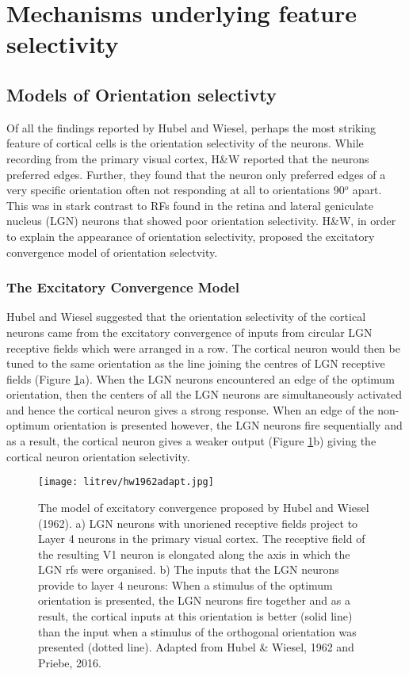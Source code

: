 \section{Mechanisms underlying feature selectivity}



\subsection{Models of Orientation selectivty}

Of all the findings reported by Hubel and Wiesel, perhaps the most striking feature of cortical cells is the orientation selectivity of the neurons. While recording from the primary visual cortex, H\&W reported that the neurons preferred edges. Further, they found that the neuron only preferred edges of a very specific orientation often not responding at all to orientations 90$^o$ apart. This was in stark contrast to RFs found in the retina and lateral geniculate nucleus (LGN) neurons that showed poor orientation selectivity. H\&W, in order to explain the appearance of orientation selectivity, proposed the excitatory convergence model of orientation selectvity.

\subsubsection{The Excitatory Convergence Model} Hubel and Wiesel suggested that the orientation selectivity of the cortical neurons came from the excitatory convergence of inputs from circular LGN receptive fields which were arranged in a row. The cortical neuron would then be tuned to the same orientation as the line joining the centres of LGN receptive fields (Figure \ref{fig:HW}a). When the LGN neurons encountered an edge of the optimum orientation, then the centers of all the LGN neurons are simultaneously activated and hence the cortical neuron gives a strong response. When an edge of the non-optimum orientation is presented however, the LGN neurons fire sequentially and as a result, the cortical neuron gives a weaker output (Figure \ref{fig:HW}b) giving the cortical neuron orientation selectivity.

	\begin{figure}[H]
	\centering
	\texttt{[image: litrev/hw1962adapt.jpg]}

	\caption{The model of excitatory convergence proposed by Hubel and Wiesel (1962). a) LGN neurons with unoriened receptive fields project to Layer 4 neurons in the primary visual cortex. The receptive field of the resulting V1 neuron is elongated along the axis in which the LGN rfs were organised. b) The inputs that the LGN neurons provide to layer 4 neurons: When a stimulus of the optimum orientation is presented, the LGN neurons fire together and as a result, the cortical inputs at this orientation is better (solid line) than the input when a stimulus of the orthogonal orientation was presented (dotted line). Adapted from Hubel \& Wiesel, 1962 and Priebe, 2016.}
	\label{fig:HW}
	\end{figure}

